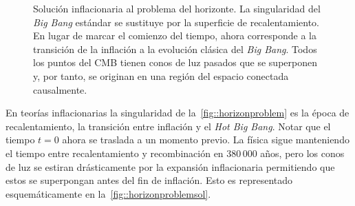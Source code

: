 \begin{figure}
    \centering
    \def\svgwidth{0.72\textwidth}
    
    \caption[Solución inflacionaria al problema del horizonte]{Solución inflacionaria al problema del horizonte. La singularidad del \textit{Big Bang} estándar se sustituye por la superficie de recalentamiento. En lugar de marcar el comienzo del tiempo, ahora corresponde a la transición de la inflación a la evolución clásica del \textit{Big Bang}. Todos los puntos del CMB tienen conos de luz pasados que se superponen y, por tanto, se originan en una región del espacio conectada causalmente.}
    \label{fig::horizonproblemsol}
\end{figure}
En teorías inflacionarias la singularidad de la~\autoref{fig::horizonproblem} es la época de recalentamiento, la transición entre inflación y el \textit{Hot Big Bang}. Notar que el tiempo \(t=0\) ahora se traslada a un momento previo. La física sigue manteniendo el tiempo entre recalentamiento y recombinación en \(380\,000\) años, pero los conos de luz se estiran drásticamente por la expansión inflacionaria permitiendo que estos se superpongan antes del fin de inflación. Esto es representado esquemáticamente en la~\autoref{fig::horizonproblemsol}.

